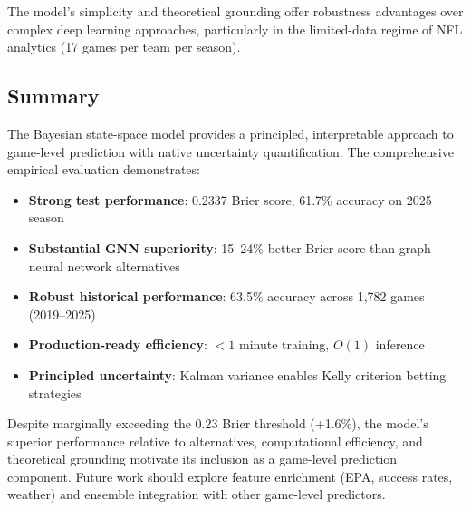 The model's simplicity and theoretical grounding offer robustness advantages over complex deep learning approaches, particularly in the limited-data regime of NFL analytics (17 games per team per season).

\subsection{Summary}

The Bayesian state-space model provides a principled, interpretable approach to game-level prediction with native uncertainty quantification. The comprehensive empirical evaluation demonstrates:

\begin{itemize}
    \item \textbf{Strong test performance}: 0.2337 Brier score, 61.7\% accuracy on 2025 season
    \item \textbf{Substantial GNN superiority}: 15--24\% better Brier score than graph neural network alternatives
    \item \textbf{Robust historical performance}: 63.5\% accuracy across 1,782 games (2019--2025)
    \item \textbf{Production-ready efficiency}: $<1$ minute training, $O(1)$ inference
    \item \textbf{Principled uncertainty}: Kalman variance enables Kelly criterion betting strategies
\end{itemize}

Despite marginally exceeding the 0.23 Brier threshold (+1.6\%), the model's superior performance relative to alternatives, computational efficiency, and theoretical grounding motivate its inclusion as a game-level prediction component. Future work should explore feature enrichment (EPA, success rates, weather) and ensemble integration with other game-level predictors.
